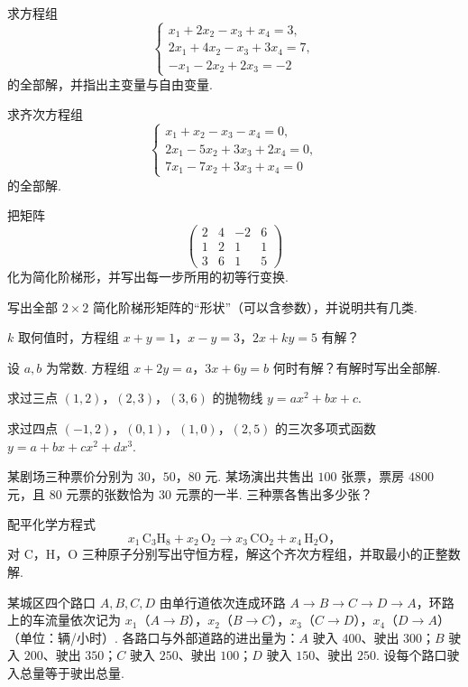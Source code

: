 {\begin{exA}
			\item\label{ex:elim:A6} 求方程组 $$\left\{\begin{array}{l}x_1+2x_2-x_3+x_4=3,\\2x_1+4x_2-x_3+3x_4=7,\\-x_1-2x_2+2x_3=-2\end{array}\right.$$ 的全部解，并指出主变量与自由变量.
			\item\label{ex:elim:A7} 求齐次方程组 $$\left\{\begin{array}{l}x_1+x_2-x_3-x_4=0,\\2x_1-5x_2+3x_3+2x_4=0,\\7x_1-7x_2+3x_3+x_4=0\end{array}\right.$$ 的全部解.
			\item\label{ex:elim:A8} 把矩阵 $$\begin{pmatrix}2&4&-2&6\\1&2&1&1\\3&6&1&5\end{pmatrix}$$ 化为简化阶梯形，并写出每一步所用的初等行变换.
			\item\label{ex:elim:A9} 写出全部 $2\times2$ 简化阶梯形矩阵的“形状”（可以含参数），并说明共有几类.
			\item\label{ex:elim:A10} $k$ 取何值时，方程组 $x+y=1$，$x-y=3$，$2x+ky=5$ 有解？
			\item\label{ex:elim:A11} 设 $a,b$ 为常数. 方程组 $x+2y=a$，$3x+6y=b$ 何时有解？有解时写出全部解.
			\item\label{ex:elim:A12} 求过三点 $(1,2)$，$(2,3)$，$(3,6)$ 的抛物线 $y=ax^2+bx+c$.
			\item\label{ex:elim:A13} 求过四点 $(-1,2)$，$(0,1)$，$(1,0)$，$(2,5)$ 的三次多项式函数 $y=a+bx+cx^2+dx^3$.
			\item\label{ex:elim:A14} 某剧场三种票价分别为 $30$，$50$，$80$ 元. 某场演出共售出 $100$ 张票，票房 $4800$ 元，且 $80$ 元票的张数恰为 $30$ 元票的一半. 三种票各售出多少张？
			\item\label{ex:elim:A15} 配平化学方程式 $$x_1\,\mathrm{C_3H_8}+x_2\,\mathrm{O_2}\to x_3\,\mathrm{CO_2}+x_4\,\mathrm{H_2O}，$$对 C，H，O 三种原子分别写出守恒方程，解这个齐次方程组，并取最小的正整数解.
			\item\label{ex:elim:A16} 某城区四个路口 $A,B,C,D$ 由单行道依次连成环路 $A\to B\to C\to D\to A$，环路上的车流量依次记为 $x_1$（$A\to B$），$x_2$（$B\to C$），$x_3$（$C\to D$），$x_4$（$D\to A$）（单位：辆/小时）. 各路口与外部道路的进出量为：$A$ 驶入 $400$、驶出 $300$；$B$ 驶入 $200$、驶出 $350$；$C$ 驶入 $250$、驶出 $100$；$D$ 驶入 $150$、驶出 $250$. 设每个路口驶入总量等于驶出总量.

\end{exA}}
